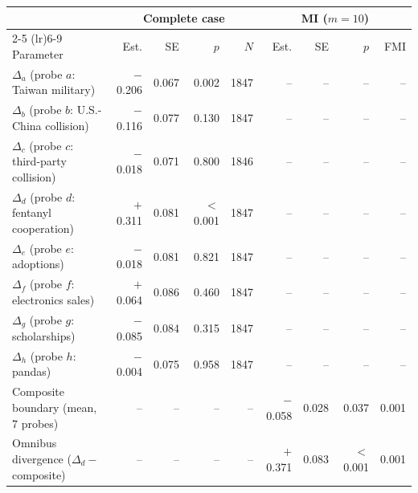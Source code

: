 \begin{tabular}{lrrrrrrrr}
\toprule
& \multicolumn{4}{c}{Complete case} & \multicolumn{4}{c}{MI ($m=10$)} \\
\cmidrule(lr){2-5} \cmidrule(lr){6-9}
Parameter & Est. & SE & $p$ & $N$ & Est. & SE & $p$ & FMI \\
\midrule
$\Delta_a$ (probe $a$: Taiwan military) & $-$0.206 & 0.067 & 0.002 & 1847 & -- & -- & -- & -- \\
$\Delta_b$ (probe $b$: U.S.-China collision) & $-$0.116 & 0.077 & 0.130 & 1847 & -- & -- & -- & -- \\
$\Delta_c$ (probe $c$: third-party collision) & $-$0.018 & 0.071 & 0.800 & 1846 & -- & -- & -- & -- \\
$\Delta_d$ (probe $d$: fentanyl cooperation) & $+$0.311 & 0.081 & $<$0.001 & 1847 & -- & -- & -- & -- \\
$\Delta_e$ (probe $e$: adoptions) & $-$0.018 & 0.081 & 0.821 & 1847 & -- & -- & -- & -- \\
$\Delta_f$ (probe $f$: electronics sales) & $+$0.064 & 0.086 & 0.460 & 1847 & -- & -- & -- & -- \\
$\Delta_g$ (probe $g$: scholarships) & $-$0.085 & 0.084 & 0.315 & 1847 & -- & -- & -- & -- \\
$\Delta_h$ (probe $h$: pandas) & $-$0.004 & 0.075 & 0.958 & 1847 & -- & -- & -- & -- \\
\midrule
Composite boundary (mean, 7 probes) & -- & -- & -- & -- & $-$0.058 & 0.028 & 0.037 & 0.001 \\
Omnibus divergence ($\Delta_d -$ composite) & -- & -- & -- & -- & $+$0.371 & 0.083 & $<$0.001 & 0.001 \\
\bottomrule
\end{tabular}
